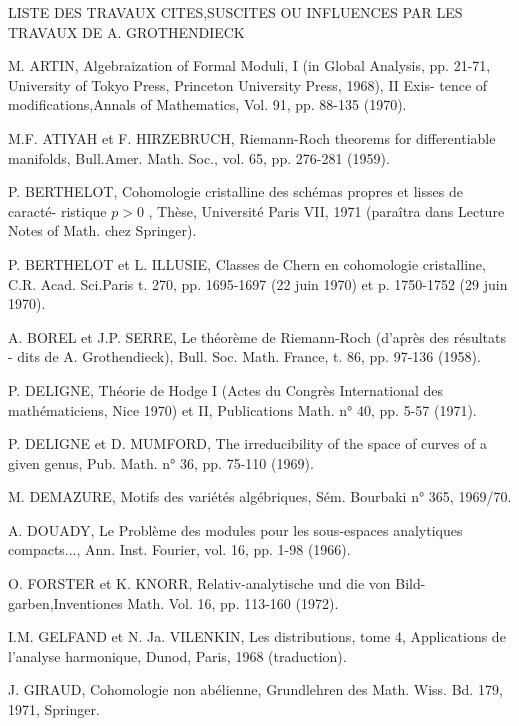 
LISTE DES TRAVAUX CITES,SUSCITES OU INFLUENCES PAR LES TRAVAUX DE A. GROTHENDIECK

M. ARTIN, Algebraization of Formal Moduli, I (in Global Analysis, pp. 21-71,
University of Tokyo Press, Princeton University Press, 1968), II Exis-%
tence of modifications,Annals of Mathematics, Vol. 91, pp. 88-135
(1970).

M.F. ATIYAH et F. HIRZEBRUCH, Riemann-Roch theorems for differentiable manifolds,
Bull.Amer. Math. Soc., vol. 65, pp. 276-281 (1959).

P. BERTHELOT, Cohomologie cristalline des schémas propres et lisses de caracté-%
ristique $p > 0$ , Thèse, Université Paris VII, 1971 (paraîtra dans
Lecture Notes of Math. chez Springer).

P. BERTHELOT et L. ILLUSIE, Classes de Chern en cohomologie cristalline, C.R. Acad.
Sci.Paris t. 270, pp. 1695-1697 (22 juin 1970) et p. 1750-1752
(29 juin 1970).

A. BOREL et J.P. SERRE, Le théorème de Riemann-Roch (d'après des résultats -%
dits de A. Grothendieck), Bull. Soc. Math. France, t. 86,
pp. 97-136 (1958).

P. DELIGNE, Théorie de Hodge I (Actes du Congrès International des mathématiciens,
Nice 1970) et II, Publications Math. n° 40, pp. 5-57 (1971).

P. DELIGNE et D. MUMFORD, The irreducibility of the space of curves of a given
genus, Pub. Math. n° 36, pp. 75-110 (1969).

M. DEMAZURE, Motifs des variétés algébriques, Sém. Bourbaki n° 365, 1969/70.

A. DOUADY, Le Problème des modules pour les sous-espaces analytiques compacts...,
Ann. Inst. Fourier, vol. 16, pp. 1-98 (1966).

O. FORSTER et K. KNORR, Relativ-analytische  und die  von Bild-%
garben,Inventiones Math. Vol. 16, pp. 113-160 (1972).

I.M. GELFAND et N. Ja. VILENKIN, Les distributions, tome 4, Applications de
l'analyse harmonique, Dunod, Paris, 1968 (traduction).

J. GIRAUD, Cohomologie non abélienne, Grundlehren des Math. Wiss. Bd. 179, 1971,
Springer.

